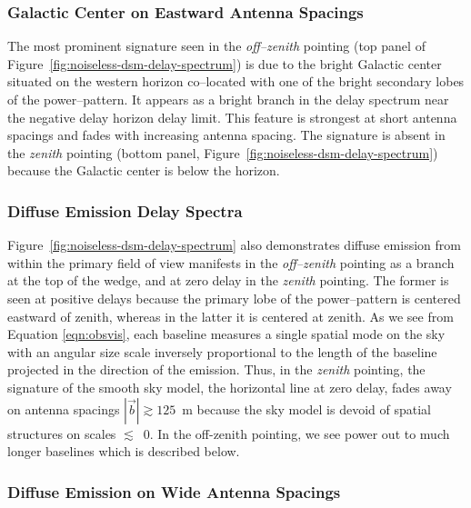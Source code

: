 \documentclass[preprint2,iop,numberedappendix]{emulateapj}
\begin{document}
\subsubsection{Galactic Center on Eastward Antenna Spacings}\label{sec:GC-east}

The most prominent signature seen in the {\it off--zenith} pointing (top panel of Figure~\ref{fig:noiseless-dsm-delay-spectrum}) is due to the bright Galactic center situated on the western horizon co--located with one of the bright secondary lobes of the power--pattern. It appears as a bright branch in the delay spectrum near the negative delay horizon delay limit. This feature is strongest at short antenna spacings and fades with increasing antenna spacing. The signature is absent in the {\it zenith} pointing (bottom panel, Figure~\ref{fig:noiseless-dsm-delay-spectrum}) because the Galactic center is below the horizon. 

\subsubsection{Diffuse Emission Delay Spectra}\label{sec:diffuse-features}

Figure~\ref{fig:noiseless-dsm-delay-spectrum} also demonstrates diffuse emission from within the primary field of view manifests in the {\it off--zenith} pointing as a branch at the top of the wedge, and at zero delay in the {\it zenith} pointing. The former is seen at positive delays because the primary lobe of the power--pattern is centered eastward of zenith, whereas in the latter it is centered at zenith. As we see from Equation \ref{eqn:obsvis}, each baseline measures a single spatial mode on the sky with an angular size scale inversely proportional to the length of the baseline projected in the direction of the emission. Thus, in the {\it zenith} pointing, the signature of the smooth sky model, the horizontal line at zero delay, fades away on antenna spacings $|\vec{b}| \gtrsim 125$~m because the sky model is devoid of spatial structures on scales $\lesssim$~0. In the off-zenith pointing, we see power out to much longer baselines which is described below.

\subsubsection{Diffuse Emission on Wide Antenna Spacings}\label{sec:diffuse-long-baselines}
\end{document}
